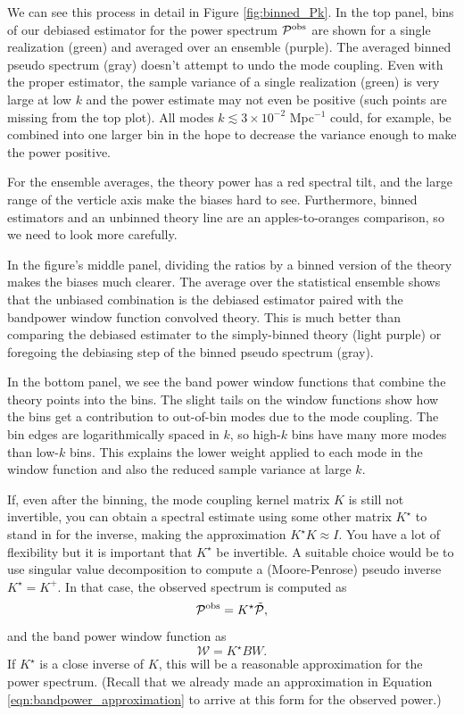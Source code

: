 We can see this process in detail in Figure \ref{fig:binned_Pk}.  In the top panel, bins of our debiased estimator for the power spectrum ${\mathcal P^{\rm obs}}$ are shown for a single realization (green) and averaged over an ensemble (purple).  The averaged binned pseudo spectrum (gray) doesn't attempt to undo the mode coupling.  Even with the proper estimator, the sample variance of a single realization (green) is very large at low $k$ and the power estimate may not even be positive (such points are missing from the top plot).  All modes $k \lesssim 3\times 10^{-2}$ Mpc$^{-1}$ could, for example, be combined into one larger bin in the hope to decrease the variance enough to make the power positive.

For the ensemble averages, the theory power has a red spectral tilt, and the large range of the verticle axis make the biases hard to see.  Furthermore, binned estimators and an unbinned theory line are an apples-to-oranges comparison, so we need to look more carefully.

In the figure's middle panel, dividing the ratios by a binned version of the theory makes the biases much clearer.  The average over the statistical ensemble shows that the unbiased combination is the debiased estimator paired with the bandpower window function convolved theory.  This is much better than comparing the debiased estimater to the simply-binned theory (light purple) or foregoing the debiasing step of the binned pseudo spectrum (gray).

    In the bottom panel, we see the band power window functions that combine the theory points into the bins.  The slight tails on the window functions show how the bins get a contribution to out-of-bin modes due to the mode coupling.  The bin edges are logarithmically spaced in $k$, so high-$k$ bins have many more modes than low-$k$ bins.  This explains the lower weight applied to each mode in the window function and also the reduced sample variance at large $k$.

If, even after the binning, the mode coupling kernel matrix $K$ is still not invertible, you can obtain a spectral estimate using some other matrix $K^\star $ to stand in for the inverse, making the approximation $K^\star K \approx I$.  You have a lot of flexibility but it is important that $K^\star $ be invertible.  A suitable choice would be to use singular value decomposition to compute a (Moore-Penrose) pseudo inverse $K^\star = K^+$.  In that case, the observed spectrum is computed as
\begin{equation}
  {\mathcal P}^{\rm obs} = K^\star   \tilde {\mathcal P},
\end{equation}
and the band power window function as
\begin{equation}
  {\mathcal W} = K^\star  B W.
\end{equation}
If $K^\star $ is a close inverse of $K$, this will be a reasonable approximation for the power spectrum.  (Recall that we already made an approximation in Equation \ref{eqn:bandpower_approximation} to arrive at this form for the observed power.)

